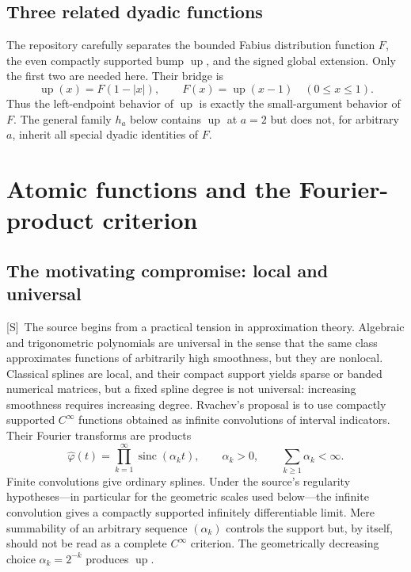 \documentclass[11pt,oneside]{article}
\theoremstyle{definition}
\theoremstyle{remark}
\newcommand{\Up}{\operatorname{up}}
\newcommand{\sinc}{\operatorname{sinc}}
\newcommand{\Smark}{\textcolor{sourceblue}{\textsf{[S]}}}
\begin{document}
\subsection{Three related dyadic functions}

The repository carefully separates the bounded Fabius distribution function $F$, the even
compactly supported bump $\Up$, and the signed global extension.  Only the first two are
needed here.  Their bridge is
\begin{equation}
 \Up(x)=F(1-|x|),\qquad F(x)=\Up(x-1)\quad(0\le x\le1).
 \label{eq:F-up-bridge}
\end{equation}
Thus the left-endpoint behavior of $\Up$ is exactly the small-argument behavior of $F$.  The
general family $h_a$ below contains $\Up$ at $a=2$ but does not, for arbitrary $a$, inherit all
special dyadic identities of $F$.

\section{Atomic functions and the Fourier-product criterion}
\label{sec:general-atomic}

\subsection{The motivating compromise: local and universal}

\Smark\ The source begins from a practical tension in approximation theory.  Algebraic and
trigonometric polynomials are universal in the sense that the same class approximates
functions of arbitrarily high smoothness, but they are nonlocal.  Classical splines are local,
and their compact support yields sparse or banded numerical matrices, but a fixed spline
degree is not universal: increasing smoothness requires increasing degree.  Rvachev's
proposal is to use compactly supported $C^\infty$ functions obtained as infinite convolutions
of interval indicators.  Their Fourier transforms are products
\begin{equation}
 \widehat\varphi(t)=\prod_{k=1}^{\infty}\sinc(\alpha_k t),
 \qquad \alpha_k>0,
 \qquad \sum_{k\ge1}\alpha_k<\infty.
 \label{eq:general-sinc-product}
\end{equation}
Finite convolutions give ordinary splines.  Under the source's regularity hypotheses---in
particular for the geometric scales used below---the infinite convolution gives a compactly
supported infinitely differentiable limit.  Mere summability of an arbitrary sequence
$(\alpha_k)$ controls the support but, by itself, should not be read as a complete $C^\infty$
criterion.  The geometrically decreasing choice $\alpha_k=2^{-k}$ produces $\Up$.
\end{document}
